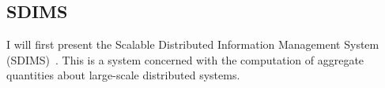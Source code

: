 \subsection*{SDIMS}
\label{sec:sdims}

I will first present the Scalable Distributed Information Management System (SDIMS)~\cite{sdims}. This is a system
concerned with the computation of aggregate quantities about large-scale distributed systems. 

